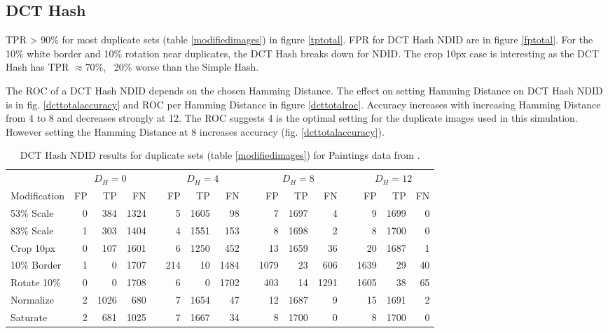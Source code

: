 \documentclass[english,12pt,a4paper,pdftex,elec,utf8]{aaltothesis}
\begin{document}
\subsection{DCT Hash}
TPR > 90\% for most duplicate sets (table \ref{modifiedimages}) in figure \ref{tptotal}. FPR for DCT Hash NDID are in figure \ref{fptotal}. For the 10\% white border and 10\% rotation near duplicates, the DCT Hash breaks down for NDID. The crop 10px case is interesting as the DCT Hash has TPR $\approx 70\%$, ~20\% worse than the Simple Hash.

The ROC of a DCT Hash NDID depends on the chosen Hamming Distance. The effect on setting Hamming Distance on DCT Hash NDID is in fig. \ref{dcttotalaccuracy} and ROC per Hamming Distance in figure \ref{dcttotalroc}. Accuracy increases with increasing Hamming Distance from 4 to 8 and decreases strongly at 12. The ROC suggests 4 is the optimal setting for the duplicate images used in this simulation. However setting the Hamming Distance at 8 increases accuracy (fig. \ref{dcttotalaccuracy}).

\begin{table}[htb]\footnotesize
\caption{ DCT Hash NDID results for duplicate sets (table \ref{modifiedimages}) for Paintings data from \cite{Vedaldi2012}. }
\label{dctresults}
\begin{center}
  \setlength\tabcolsep{3pt} %
  \begin{tabular}{@{}lrrrrrrrrrrrrrrr@{}}
    \toprule
    & \multicolumn{3}{c}{$D_H = 0$} &\phantom{abc} &\multicolumn{3}{c}{$D_H = 4$} &\phantom{abc} & \multicolumn{3}{c}{$D_H=8$} &\phantom{abc} & \multicolumn{3}{c}{$D_H=12$}\\
\cmidrule{2-4} \cmidrule{6-8} \cmidrule{10-12} \cmidrule{14-16}
    Modification & FP & TP & FN &\phantom{abc} & FP & TP & FN &\phantom{abc} & FP & TP & FN &\phantom{abc} & FP & TP & FN\\ \midrule
    53\% Scale   & 0 & 384 & 1324 &\phantom{abc} & 5 & 1605 & 98 &\phantom{abc} & 7 & 1697 & 4 &\phantom{abc} & 9 & 1699 & 0\\
    83\% Scale   & 1 & 303 & 1404 &\phantom{abc} & 4 & 1551 & 153 &\phantom{abc} & 8 & 1698 & 2 &\phantom{abc} & 8 & 1700 & 0\\
    Crop 10px    & 0 & 107 & 1601 &\phantom{abc} & 6 & 1250 & 452 &\phantom{abc} & 13& 1659 & 36 &\phantom{abc} & 20 & 1687 & 1\\
    10\% Border  & 1 & 0 & 1707 & \phantom{abc} & 214 & 10 & 1484 &\phantom{abc} & 1079 & 23 & 606 &\phantom{abc} & 1639 & 29 & 40\\
    Rotate 10\%  & 0 & 0 & 1708 &\phantom{abc} & 6 & 0 & 1702 &\phantom{abc} & 403 & 14 & 1291 &\phantom{abc} & 1605 & 38 & 65\\
    Normalize    & 2 & 1026 & 680 &\phantom{abc} & 7 & 1654 & 47 &\phantom{abc} & 12 & 1687 & 9 &\phantom{abc} & 15 & 1691 & 2\\
    Saturate     & 2 & 681 & 1025 &\phantom{abc} & 7 & 1667 & 34 &\phantom{abc} & 8 & 1700 & 0 &\phantom{abc} & 8 & 1700 & 0\\
    \bottomrule
\end{tabular}
\end{center}
\end{table}
\end{document}
